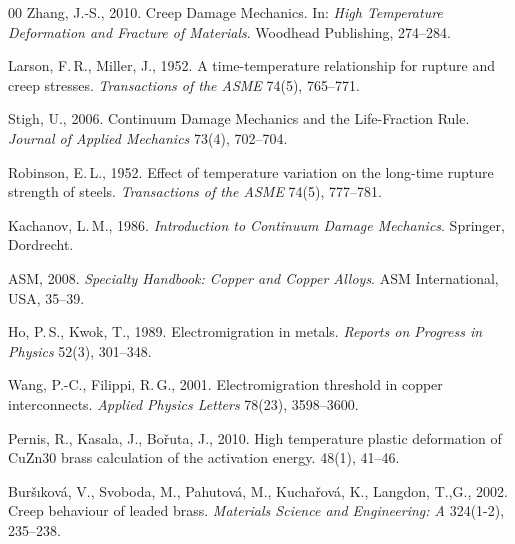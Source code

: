 \documentclass[5p,times,procedia]{elsarticle}
\begin{document}
\begin{thebibliography}{00}
Zhang, J.-S., 2010.
Creep Damage Mechanics.
In: \textit{High Temperature Deformation and Fracture of Materials}.
Woodhead Publishing, 274--284.

Larson, F.\,R., Miller, J., 1952.
A time-temperature relationship for rupture and creep stresses.
\textit{Transactions of the ASME} 74(5), 765--771.

Stigh, U., 2006.
Continuum Damage Mechanics and the Life-Fraction Rule.
\textit{Journal of Applied Mechanics} 73(4), 702--704.

Robinson, E.\,L., 1952.
Effect of temperature variation on the long-time rupture strength of steels.
\textit{Transactions of the ASME} 74(5), 777--781.

Kachanov, L.\,M., 1986.
\textit{Introduction to Continuum Damage Mechanics}.
Springer, Dordrecht.

ASM, 2008.
\textit{Specialty Handbook: Copper and Copper Alloys}.
ASM International, USA, 35--39.

Ho, P.\,S., Kwok, T., 1989.
Electromigration in metals.
\textit{Reports on Progress in Physics} 52(3), 301--348.

Wang, P.-C., Filippi, R.\,G., 2001.
Electromigration threshold in copper interconnects.
\textit{Applied Physics Letters} 78(23), 3598--3600.


 Pernis, R., Kasala, J., Bořuta, J., 2010. High temperature plastic deformation of CuZn30 brass calculation of the activation energy. 48(1), 41--46.


 Buršıková, V., Svoboda, M., Pahutová, M., Kuchařová, K., Langdon, T.,G., 2002. Creep behaviour of leaded brass. \textit{Materials Science and Engineering: A} 324(1-2), 235--238.


\end{thebibliography}

\clearpage\onecolumn
\end{document}
